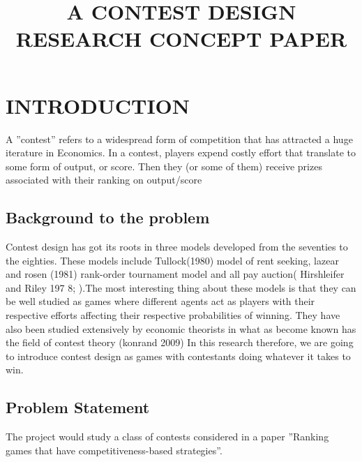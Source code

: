 \documentclass{article}
\begin{document}

\title{A CONTEST DESIGN RESEARCH CONCEPT PAPER}
\maketitle

\section {INTRODUCTION }{A ”contest” refers to a widespread form of competition that has attracted a
huge iterature in Economics. In a contest, players expend costly effort that
translate to some form of output, or score. Then they (or some of them) receive
prizes associated with their ranking on output/score }

\subsection {Background to the problem} {Contest design has got its roots in three models developed from the seventies to the eighties. These models include Tullock(1980) model of rent seeking, lazear and rosen (1981)  rank-order tournament model and all pay auction( Hirshleifer and Riley 197 8; ).The most
interesting thing about these models is that they can be well studied as games
where different agents act as players with their respective efforts affecting their
respective probabilities of winning. They have also been studied extensively by economic theorists in what as become known has the field of contest theory (konrand 2009) In this research therefore, we are going to
introduce contest design as games with contestants doing whatever it takes to
win. }

\subsection {Problem Statement} {
The project would study a class of contests considered in a paper ”Ranking games that have competitiveness-based strategies”. 
} 
\end{document}
